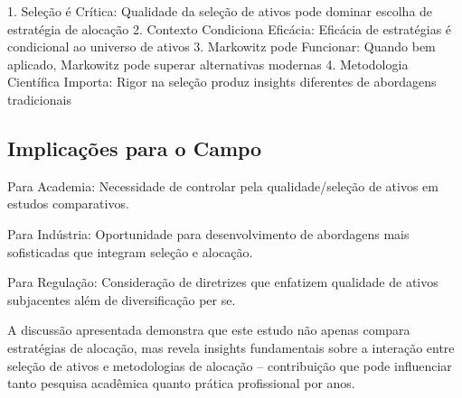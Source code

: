 1. Seleção é Crítica: Qualidade da seleção de ativos pode dominar escolha de estratégia de alocação
2. Contexto Condiciona Eficácia: Eficácia de estratégias é condicional ao universo de ativos
3. Markowitz pode Funcionar: Quando bem aplicado, Markowitz pode superar alternativas modernas
4. Metodologia Científica Importa: Rigor na seleção produz insights diferentes de abordagens tradicionais

\subsection{Implicações para o Campo}

Para Academia: Necessidade de controlar pela qualidade/seleção de ativos em estudos comparativos.

Para Indústria: Oportunidade para desenvolvimento de abordagens mais sofisticadas que integram seleção e alocação.

Para Regulação: Consideração de diretrizes que enfatizem qualidade de ativos subjacentes além de diversificação per se.

A discussão apresentada demonstra que este estudo não apenas compara estratégias de alocação, mas revela insights fundamentais sobre a interação entre seleção de ativos e metodologias de alocação – contribuição que pode influenciar tanto pesquisa acadêmica quanto prática profissional por anos.
